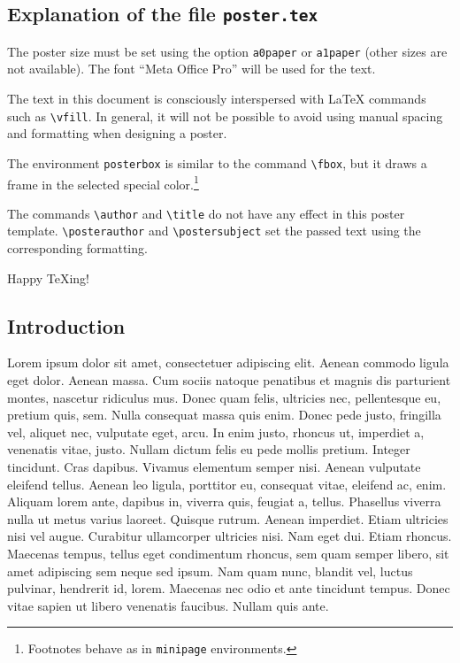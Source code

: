 \documentclass[a1paper, english]{article}
\begin{document}

\begin{posterbox}
	\section*{Explanation of the file \texttt{poster.tex}}
	The poster size must be set using the option \verb+a0paper+ or \verb+a1paper+ (other sizes are not available).
	The font “Meta Office Pro” will be used for the text.

	The text in this document is consciously interspersed with \LaTeX{} commands such as \verb+\vfill+.
	In general, it will not be possible to avoid using manual spacing and formatting when designing a poster.

	The environment \texttt{posterbox} is similar to the command \verb+\fbox+, but it draws a frame in the selected special color.\footnote{%
		Footnotes behave as in \texttt{minipage} environments.
	}

	The commands \verb+\author+ and \verb+\title+ do not have any effect in this poster template.
	\verb+\posterauthor+ and \verb+\postersubject+ set the passed text using the corresponding formatting.

	\bigskip

	Happy \TeX{}ing!
\end{posterbox}

\vfill

\begin{posterbox}
	\section*{Introduction}
	Lorem ipsum dolor sit amet, consectetuer adipiscing elit. Aenean commodo ligula eget dolor. Aenean massa. Cum sociis natoque penatibus et magnis dis parturient montes, nascetur ridiculus mus. Donec quam felis, ultricies nec, pellentesque eu, pretium quis, sem. Nulla consequat massa quis enim. Donec pede justo, fringilla vel, aliquet nec, vulputate eget, arcu. In enim justo, rhoncus ut, imperdiet a, venenatis vitae, justo. Nullam dictum felis eu pede mollis pretium. Integer tincidunt. Cras dapibus. Vivamus elementum semper nisi. Aenean vulputate eleifend tellus. Aenean leo ligula, porttitor eu, consequat vitae, eleifend ac, enim. Aliquam lorem ante, dapibus in, viverra quis, feugiat a, tellus. Phasellus viverra nulla ut metus varius laoreet. Quisque rutrum. Aenean imperdiet. Etiam ultricies nisi vel augue. Curabitur ullamcorper ultricies nisi. Nam eget dui. Etiam rhoncus. Maecenas tempus, tellus eget condimentum rhoncus, sem quam semper libero, sit amet adipiscing sem neque sed ipsum. Nam quam nunc, blandit vel, luctus pulvinar, hendrerit id, lorem. Maecenas nec odio et ante tincidunt tempus. Donec vitae sapien ut libero venenatis faucibus. Nullam quis ante.
\end{posterbox}
\end{document}
